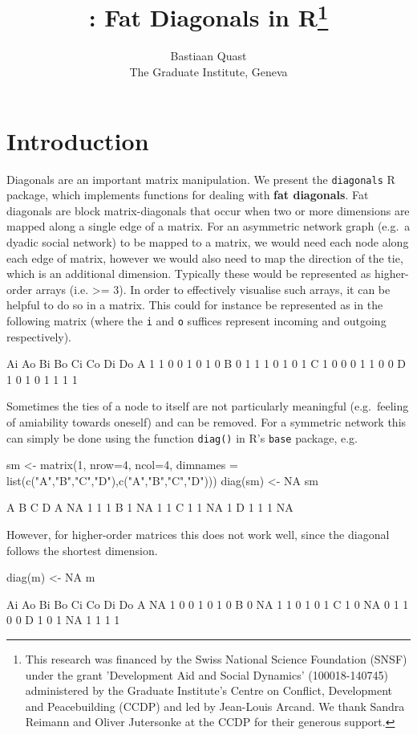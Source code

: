 \documentclass[article]{jss}
\author{
Bastiaan Quast\\The Graduate Institute, Geneva
}
\title{\pkg{diagonals}: Fat Diagonals in
R\thanks{This research was financed by the Swiss National Science Foundation (SNSF) under the grant 'Development Aid and Social Dynamics' (100018-140745) administered by the Graduate Institute's Centre on Conflict, Development and Peacebuilding (CCDP) and led by Jean-Louis Arcand. We thank Sandra Reimann and Oliver Jutersonke at the CCDP for their generous support.}}
\begin{document}
\section{Introduction}\label{introduction}

Diagonals are an important matrix manipulation. We present the
\texttt{diagonals} R package, which implements functions for dealing
with \textbf{fat diagonals}. Fat diagonals are block matrix-diagonals
that occur when two or more dimensions are mapped along a single edge of
a matrix. For an asymmetric network graph (e.g.~a dyadic social network)
to be mapped to a matrix, we would need each node along each edge of
matrix, however we would also need to map the direction of the tie,
which is an additional dimension. Typically these would be represented
as higher-order arrays (i.e. \textgreater{}= 3). In order to effectively
visualise such arrays, it can be helpful to do so in a matrix. This
could for instance be represented as in the following matrix (where the
\texttt{i} and \texttt{o} suffices represent incoming and outgoing
respectively).

\begin{CodeChunk}
\begin{CodeOutput}
  Ai Ao Bi Bo Ci Co Di Do
A  1  1  0  0  1  0  1  0
B  0  1  1  1  0  1  0  1
C  1  0  0  0  1  1  0  0
D  1  0  1  0  1  1  1  1
\end{CodeOutput}
\end{CodeChunk}

Sometimes the ties of a node to itself are not particularly meaningful
(e.g.~feeling of amiability towards oneself) and can be removed. For a
symmetric network this can simply be done using the function
\texttt{diag()} in R's \texttt{base} package, e.g.

\begin{CodeChunk}
\begin{CodeInput}
sm <- matrix(1, nrow=4, ncol=4,
             dimnames = list(c("A","B","C","D"),c("A","B","C","D")))
diag(sm) <- NA
sm
\end{CodeInput}
\begin{CodeOutput}
   A  B  C  D
A NA  1  1  1
B  1 NA  1  1
C  1  1 NA  1
D  1  1  1 NA
\end{CodeOutput}
\end{CodeChunk}

However, for higher-order matrices this does not work well, since the
diagonal follows the shortest dimension.

\begin{CodeChunk}
\begin{CodeInput}
diag(m) <- NA
m
\end{CodeInput}
\begin{CodeOutput}
  Ai Ao Bi Bo Ci Co Di Do
A NA  1  0  0  1  0  1  0
B  0 NA  1  1  0  1  0  1
C  1  0 NA  0  1  1  0  0
D  1  0  1 NA  1  1  1  1
\end{CodeOutput}
\end{CodeChunk}
\end{document}
